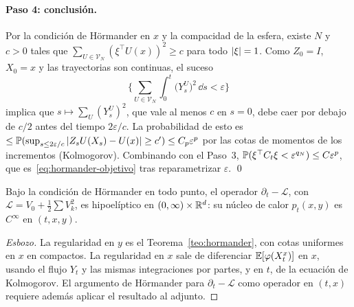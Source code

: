 \paragraph{Paso 4: conclusión.} Por la condición de Hörmander en $x$ y la compacidad de la esfera,
existe $N$ y $c>0$ tales que $\sum_{U\in\mathcal V_N}(\xi^\top U(x))^2\ge c$ para todo $\abs\xi=1$. Como $Z_0=I$, $X_0=x$ y
las trayectorias son continuas, el suceso
\[
  \Big\{\sum_{U\in\mathcal V_N}\int_0^t\big(Y^U_s\big)^2\,\dd s<\varepsilon\Big\}
\]
implica que $s\mapsto\sum_U(Y^U_s)^2$, que vale al menos $c$ en $s=0$, debe caer por debajo de $c/2$ antes
del tiempo $2\varepsilon/c$. La probabilidad de esto es $\le\P(\sup_{s\le2\varepsilon/c}\abs{Z_sU(X_s)-U(x)}\ge c')\le C_p\varepsilon^p$
por las cotas de momentos de los incrementos (Kolmogorov). Combinando con el Paso~3,
$\P(\xi^\top C_t\xi<\varepsilon^{q_N})\le C\varepsilon^p$, que es~\eqref{eq:hormander-objetivo} tras reparametrizar $\varepsilon$.
\qed

\begin{corolario}[Hipoelipticidad]
Bajo la condición de Hörmander en todo punto, el operador
$\partial_t-\mathcal L$, con $\mathcal L=V_0+\frac12\sum V_k^2$, es hipoelíptico en $(0,\infty)\times\R^d$: su núcleo de calor $p_t(x,y)$ es $C^\infty$
en $(t,x,y)$.
\end{corolario}

\begin{proof}[Esbozo]
La regularidad en $y$ es el Teorema~\ref{teo:hormander}, con cotas uniformes en $x$ en compactos. La
regularidad en $x$ sale de diferenciar $\E[\varphi(X_t^x)]$ en $x$, usando el flujo $Y_t$ y las mismas integraciones
por partes, y en $t$, de la ecuación de Kolmogorov. El argumento de Hörmander para $\partial_t-\mathcal L$
como operador en $(t,x)$ requiere además aplicar el resultado al adjunto.
\end{proof}

